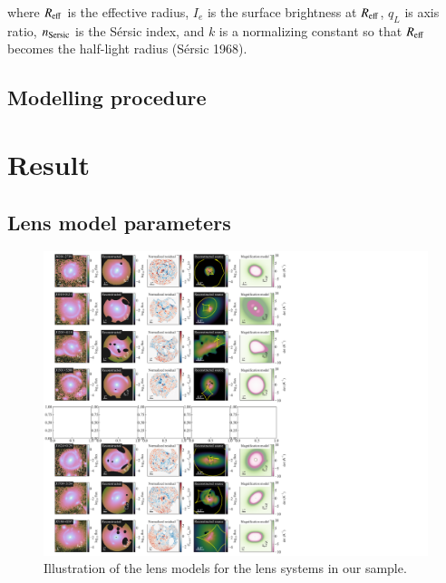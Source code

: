 \documentclass{aa}
\begin{document}
where $R_{\rm eff}$ is the effective radius, $I_e$ is the surface brightness at $R_{\rm eff}$, $q_L$ is axis ratio, $n_{\rm Sersic}$ is the Sérsic index, and $k$ is a normalizing constant so that $R_{\rm eff}$ becomes the half-light radius (Sérsic 1968).

\subsection{Modelling procedure}


\section{Result} \label{sec:result}

\subsection{Lens model parameters}

\begin{figure}
	\centering
	\includegraphics[width=1.55\textwidth]{figures/lens_models.pdf}
	\caption{\label{fig:montage}
	Illustration of the lens models for the lens systems in our sample.
	}
\end{figure}
\end{document}

